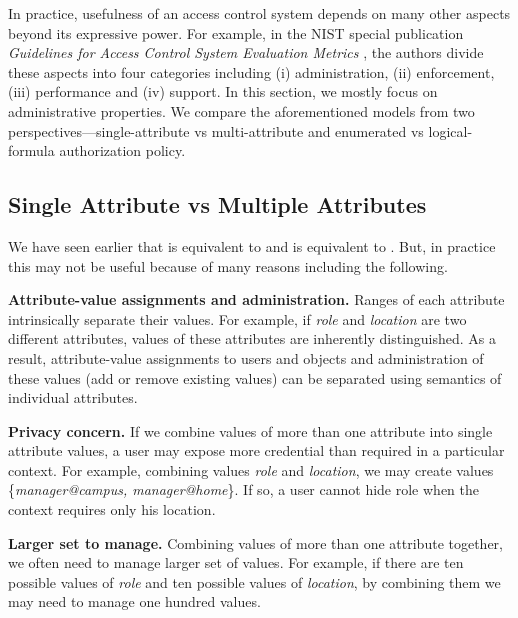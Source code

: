 \label{sec:beyond}
In practice, usefulness of an access control system depends on many other aspects beyond its expressive power. For example, in the NIST special publication \textit{Guidelines  for Access Control System Evaluation Metrics} \cite{access-control-evaluation}, the authors divide these aspects into four categories including (i) administration, (ii) enforcement, (iii) performance and (iv) support. In this section, we mostly focus on administrative properties. We compare the aforementioned models from two perspectives---single-attribute vs multi-attribute and enumerated vs logical-formula authorization policy.

\subsection{Single Attribute vs Multiple Attributes}

We have seen earlier that \EPOneOneModels{} is equivalent to \EPMNModel{} and \LPOneOne{} is equivalent to \LPMN{}. But, in practice this may not be useful because of many reasons including the following.

\textbf{Attribute-value assignments and administration.} Ranges of each attribute intrinsically separate their values. For example, if \textit{role} and \textit{location} are two different attributes, values of these attributes are inherently distinguished. As a result, attribute-value assignments to users and objects and administration of these values (add or remove existing values) can be separated using semantics of individual attributes.

\textbf{Privacy concern.} If we combine values of  more than one attribute into single attribute values, a user may expose more credential than required in a particular context.  For example, combining values \textit{role} and \textit{location}, we may create values \{\textit{manager@campus, manager@home}\}. If so, a user cannot hide role  when the context requires only his location.



\textbf{Larger set to manage.} Combining values of more than one attribute together, we often need to manage larger set of values. For example, if there are ten possible values of \textit{role} and ten possible values of \textit{location}, by combining them we may need to manage one hundred values.  



